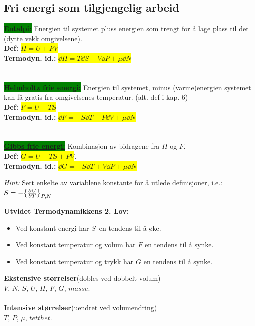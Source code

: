 \documentclass[10pt,a4paper]{article}
\renewcommand{\b}{\textbf}
\renewcommand{\u}{\underline}
\renewcommand{\i}{\textit}
\newcommand{\gr}{\colorbox{green}}
\begin{document}
\begin{multicols}{2}
\subsection*{Fri energi som tilgjengelig arbeid}
\begin{framed}
\gr{\u{\b{Entalpi:}}} Energien til systemet pluss energien som trengt for å lage plass til det (dytte vekk omgivelsene). \\
\b{Def:} \colorbox{yellow}{$H = U + PV$} \\
\b{Termodyn. id.:} \colorbox{yellow}{$\dd H = T\dd S + V\dd P + \mu \dd N$}
\\ \\ \\
\gr{\u{\b{Helmholtz frie energi:}}} Energien til systemet, minus (varme)energien systemet kan få gratis fra omgivelsenes temperatur. (alt. def i kap. 6) \\
\b{Def:} \colorbox{yellow}{$F = U - TS$} \\
\b{Termodyn. id.:} \colorbox{yellow}{$\dd F = -S\dd T - P\dd V + \mu \dd N$}
\\ \\ \\
\gr{\u{\b{Gibbs frie energi:}}} Kombinasjon av bidragene fra $H$ og $F$. \\
\b{Def:} \colorbox{yellow}{$G = U - TS + PV$}.\\
\b{Termodyn. id.:} \colorbox{yellow}{$\dd G = -S\dd T + V\dd P + \mu \dd N$}
\end{framed}
\i{Hint:} Sett enkelte av variablene konstante for å utlede definisjoner, i.e.:
$ S = -\qty{\pdv{G}{T}}_{P,N}$
\\
\newpage


\begin{framed}
\b{Utvidet Termodynamikkens 2. Lov:}
	\begin{itemize}
		\item Ved konstant energi har $S$ en tendens til å øke.
		\item Ved konstant temperatur og volum har $F$ en tendens til å synke.
		\item Ved konstant temperatur og trykk har $G$ en tendens til å synke.
	\end{itemize}
\end{framed}

\begin{framed}
\b{Ekstensive størrelser}(dobles ved dobbelt volum)\\ $V$, $N$, $S$, $U$, $H$, $F$, $G$, $masse$.
\\ \\
\b{Intensive størrelser}(uendret ved volumendring)\\ $T$, $P$, $\mu$, $tetthet$.
\end{framed}





\end{multicols}
\end{document}
